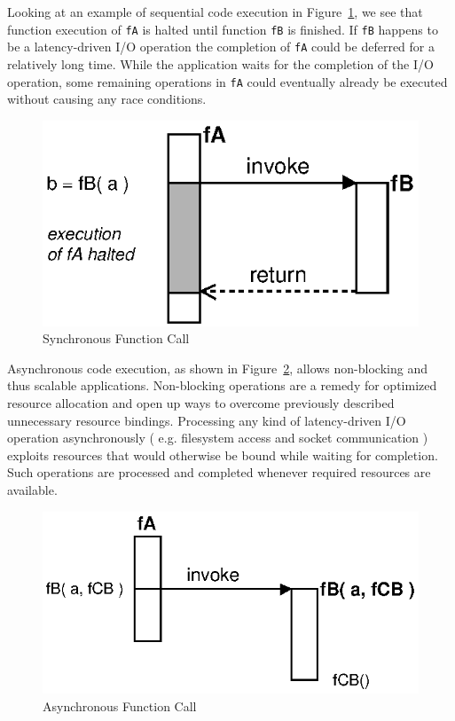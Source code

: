 Looking at an example of sequential code execution in Figure~\ref{fig:Closures_Synchronous}, we see that function execution of \texttt{fA} is halted until function \texttt{fB} is finished.
If \texttt{fB} happens to be a latency-driven I/O operation the completion of \texttt{fA} could be deferred for a relatively long time.
While the application waits for the completion of the I/O operation, some remaining operations in \texttt{fA} could eventually already be executed without causing any race conditions.
\begin{figure}[!ht]
	\centering
  \includegraphics{figures/Closures_Synchronous}
	\caption{Synchronous Function Call}
	\label{fig:Closures_Synchronous}
\end{figure}

Asynchronous code execution, as shown in Figure~\ref{fig:Closures_Asynchronous}, allows non-blocking and thus scalable applications.
Non-blocking operations are a remedy for optimized resource allocation and open up ways to overcome previously described unnecessary resource bindings.
Processing any kind of latency-driven I/O operation asynchronously ( e.g. filesystem access and socket communication ) exploits resources that would otherwise be bound while waiting for completion.
Such operations are processed and completed whenever required resources are available.
\begin{figure}[!ht]
	\centering
  \includegraphics{figures/Closures_Asynchronous}
	\caption{Asynchronous Function Call}
	\label{fig:Closures_Asynchronous}
\end{figure}

